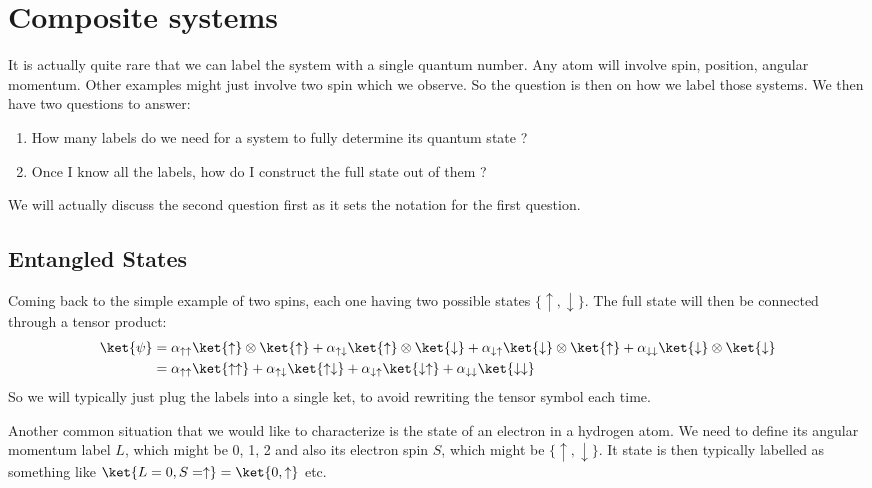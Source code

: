 \section{Composite systems}
It is actually quite rare that we can label the system with a single quantum number. Any atom will involve spin, position, angular momentum. Other examples might just involve two spin which we observe. So the question is then on how we label those systems. We then have two questions to answer:
\begin{enumerate}
\item How many labels do we need for a system to fully determine its quantum state ?
\item Once I know all the labels, how do I construct the full state out of them ?
\end{enumerate}
We will actually discuss the second question first as it sets the notation for the first question.



\subsection{Entangled States}
 
Coming back to the simple example of two spins, each one having two possible states $\{\uparrow, \downarrow\}$. The full state will then be connected through a tensor product:
\begin{align}
\ket{\psi} &= \alpha_{\uparrow\uparrow}\ket{\uparrow}\otimes\ket{\uparrow}+\alpha_{\uparrow\downarrow}\ket{\uparrow}\otimes\ket{\downarrow}+\alpha_{\downarrow\uparrow}\ket{\downarrow}\otimes\ket{\uparrow}+\alpha_{\downarrow\downarrow}\ket{\downarrow}\otimes\ket{\downarrow}\\
&= \alpha_{\uparrow\uparrow}\ket{\uparrow\uparrow}+\alpha_{\uparrow\downarrow}\ket{\uparrow\downarrow}+\alpha_{\downarrow\uparrow}\ket{\downarrow \uparrow}+\alpha_{\downarrow\downarrow}\ket{\downarrow\downarrow}
\end{align}
So we will typically just plug the labels into a single ket, to avoid rewriting the tensor symbol each time. 

Another common situation that we would like to characterize is the state of an electron in a hydrogen atom. We need to define its angular momentum label $L$, which might be 0, 1, 2 and also its electron spin $S$, which might be $\{\uparrow, \downarrow\}$. It state is then typically labelled as something like $\ket{L=0, S=\uparrow} = \ket{0,\uparrow}$ etc.

